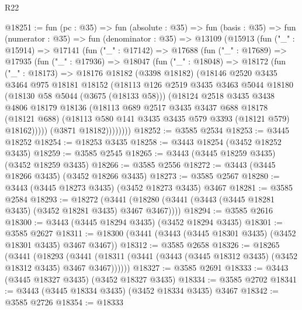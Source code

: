 \begin{lexlean}{R22}
\begin{coremodule}
@18251 := fun (pc : @35) =>
  fun (absolute : @35) =>
  fun (basis : @35) =>
  fun (numerator : @35) =>
  fun (denominator : @35) =>
  @13109
    (@15913
      (fun ("_" : @15914) =>
      @17141
        (fun ("_" : @17142) =>
        @17688
          (fun ("_" : @17689) =>
          @17935
            (fun ("_" : @17936) =>
            @18047
              (fun ("_" : @18048) =>
              @18172
                (fun ("_" : @18173) =>
                @18176
                  @18182
                  (@3398 @18182)
                  (@18146
                    @2520
                    @3435
                    @3464
                    @975
                    @18181
                    @18152
                    (@18113
                      @126
                      @2519
                      @3435
                      @3463
                      @5044
                      @18180
                      (@18130 @58 @5044 (@3675 (@18133 @58)))
                      (@18124
                        @2518
                        @3435
                        @3438
                        @4806
                        @18179
                        @18136
                        (@18113
                          @689
                          @2517
                          @3435
                          @3437
                          @688
                          @18178
                          (@18121 @688)
                          (@18113 @580 @141 @3435 @3435 @579 @3393 (@18121 @579) @18162)))))
                  (@3871 @18182))))))))
@18252 := @3585 @2534
@18253 := @3445 @18252
@18254 := @18253 @3435
@18258 := @3443 @18254 (@3452 @18252 @3435)
@18259 := @3585 @2545
@18265 := @3443 (@3445 @18259 @3435) (@3452 @18259 @3435)
@18266 := @3585 @2556
@18272 := @3443 (@3445 @18266 @3435) (@3452 @18266 @3435)
@18273 := @3585 @2567
@18280 := @3443 (@3445 @18273 @3435) (@3452 @18273 @3435) @3467
@18281 := @3585 @2584
@18293 := @18272
    (@3441 (@18280 (@3441 (@3443 (@3445 @18281 @3435) (@3452 @18281 @3435) @3467 @3467))))
@18294 := @3585 @2616
@18300 := @3443 (@3445 @18294 @3435) (@3452 @18294 @3435)
@18301 := @3585 @2627
@18311 := @18300 (@3441 (@3443 (@3445 @18301 @3435) (@3452 @18301 @3435) @3467 @3467))
@18312 := @3585 @2658
@18326 := @18265
    (@3441
      (@18293
        (@3441 (@18311 (@3441 (@3443 (@3445 @18312 @3435) (@3452 @18312 @3435) @3467 @3467))))))
@18327 := @3585 @2691
@18333 := @3443 (@3445 @18327 @3435) (@3452 @18327 @3435)
@18334 := @3585 @2702
@18341 := @3443 (@3445 @18334 @3435) (@3452 @18334 @3435) @3467
@18342 := @3585 @2726
@18354 := @18333

\end{coremodule}
\end{lexlean}
